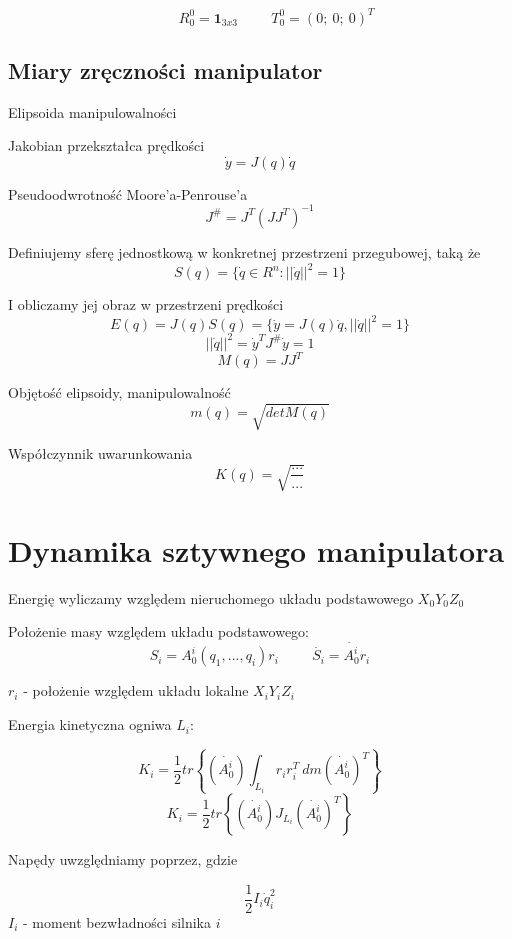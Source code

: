 \documentclass{article}
\newenvironment{kol2}{\noindent \begin{minipage}[t]{0.5\linewidth}}{\end{minipage}}
\begin{document}
\large
$$  \hspace{1cm}
    R_0^0 = \textbf{1}_{3x3}
    \hspace{1cm}
    T_0^0 = ( 0;\ 0;\ 0 )^T
$$
\normalsize

\subsection{Miary zręczności manipulator}
Elipsoida manipulowalności

Jakobian przekształca prędkości
$$ \dot{y} = J(q) \dot{q} $$

Pseudoodwrotność Moore'a-Penrouse'a
$$ J^{\#} = J^T (J J^T)^{-1} $$

Definiujemy sferę jednostkową w konkretnej przestrzeni przegubowej, taką że
$$ S(q) = \{ \dot{q} \in R^n : {||\dot{q}||}^2 = 1 \} $$

I obliczamy jej obraz w przestrzeni prędkości
$$ E(q) = J(q) S(q) = \{ \dot{y} = J(q)\dot{q}, {||\dot{q}||}^2 = 1 \} $$
$$ {||\dot{q}||}^2 = \dot{y}^T J^{\#} \dot{y} = 1 $$
$$ M(q) = J J^T $$

Objętość elipsoidy, manipulowalność
$$ m(q) = \sqrt{det M(q)} $$

Współczynnik uwarunkowania
$$ K(q) = \sqrt{ \frac{...}{...} }$$



\newpage
\section{Dynamika sztywnego manipulatora}

Energię wyliczamy względem nieruchomego układu podstawowego $X_0Y_0Z_0$

\noindent
Położenie masy względem układu podstawowego:
$$ S_i = A_0^i(q_1, ..., q_i) r_i \hspace{1cm} \dot{S_i} = \dot{A_0^i} r_i $$

$ r_i $ - położenie względem układu lokalne $X_iY_iZ_i$

\vspace{0.5cm}
\begin{kol2}
    Energia kinetyczna ogniwa $L_i$:

    $$ K_i = \frac12 tr\left\{ (\dot{A_0^i}) \int_{L_i} r_i r_i^T\ dm (\dot{A_0^i})^T \right\} $$
    $$ K_i = \frac12 tr\left\{ (\dot{A_0^i}) J_{L_i} (\dot{A_0^i})^T \right\} $$
\end{kol2}
\begin{kol2}
    Napędy uwzględniamy poprzez, gdzie

    $$ \frac12 I_i \dot{q}^2_i $$
    $ I_i $ - moment bezwładności silnika $i$
\end{kol2}
\end{document}
